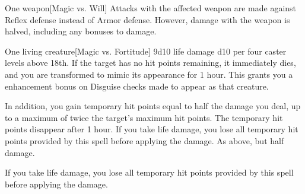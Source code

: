 \begin{spellheader}
\end{spellheader}
\begin{spelleffects}
    \spellrng{\rngtouch}
    \spelldur{\rngclose}
    \begin{spelltarget}{One weapon}[Magic vs. Will]
        \spellsuccess Attacks with the affected weapon are made against Reflex defense instead of Armor defense. However, damage with the weapon is halved, including any bonuses to damage.
    \end{spelltarget}
\end{spelleffects}
\begin{spellfooter}
    
\end{spellfooter}

\begin{spellheader}
\end{spellheader}
\begin{spelleffects}
    \spellrng{\rngclose}
    \begin{spelltarget}{One living creature}[Magic vs. Fortitude]
        \spellsuccess 9d10 life damage \add d10 per four caster levels above 18th. If the target has no hit points remaining, it immediately dies, and you are transformed to mimic its appearance for 1 hour. This grants you a  enhancement bonus on Disguise checks made to appear as that creature.

        In addition, you gain temporary hit points equal to half the damage you deal, up to a maximum of twice the target's maximum hit points. The temporary hit points disappear after 1 hour. If you take life damage, you lose all temporary hit points provided by this spell before applying the damage.
        \spellfailure As above, but half damage.
    \end{spelltarget}
\end{spelleffects}
\begin{spellfooter}
    \spellnotes If you take life damage, you lose all temporary hit points provided by this spell before applying the damage.
\end{spellfooter}

